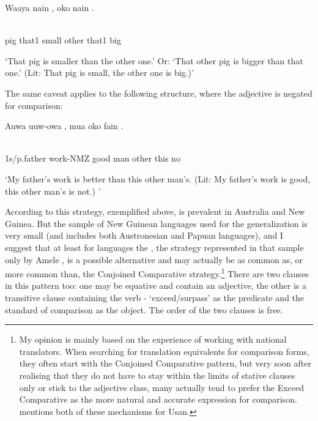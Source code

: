 \ea%
\label{ex:x1325}
\gll Waaya  nain  ,  oko  nain  . \\
      \\
\glt
\z

pig  that1  small  other  that1  big

`That pig is smaller than the other one.' Or: `That other pig is bigger than that one.' (Lit: That pig is small, the other one is big.)'

The same caveat applies to the following structure, where the adjective is negated for comparison:

\ea%
\label{ex:x1326}
\gll Auwa  uuw-owa  ,  mua  oko  fain  . \\
      \\
\glt
\z

1s/p.father  work-NMZ  good  man  other  this  no

`My father's work is better than this other man's. (Lit: My father's work is good, this other man's is not.) '

According to \citet{Stassen2008} this  strategy, exemplified above, is prevalent in  Australia and New Guinea. But the sample of New Guinean languages used for the generalization is very small (and includes both Austronesian and Papuan languages), and I suggest that at least for  languages the , the strategy represented in that sample only by Amele \citep[134-135]{Roberts1987}, is a possible alternative and may actually be as common as, or more common than, the Conjoined Comparative strategy.\footnote{My opinion is mainly based on the experience of working with national translators. When searching for translation equivalents for comparison forms, they often start with the Conjoined Comparative pattern, but very soon after realising that they do not have to stay within the limits of stative clauses only or stick to the adjective class, many actually tend to prefer the Exceed Comparative as the more natural and accurate expression for comparison.  \citet[68]{Reesink1987} mentions both of these mechanisms for Usan. }   There are two clauses in this pattern too: one may be equative and contain an adjective, the other is a transitive clause containing the verb - `exceed/surpass' as the predicate and the standard of comparison as the object. The order of the two clauses is free.


